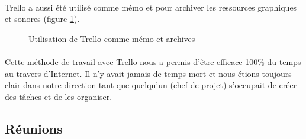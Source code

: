 \paragraph{}
Trello a aussi été utilisé comme mémo et pour archiver les ressources graphiques et sonores (figure \ref{trellomemo}).

\begin{figure}[H]\centering
  \caption{Utilisation de Trello comme mémo et archives}
  \label{trellomemo}
\end{figure}

\paragraph{}
Cette méthode de travail avec Trello nous a permis d’être efficace 100\% du temps au travers d'Internet. Il n’y avait jamais de temps mort et nous étions toujours clair dans notre direction tant que quelqu’un (chef de projet) s’occupait de créer des tâches et de les organiser.

\subsection{Réunions}

